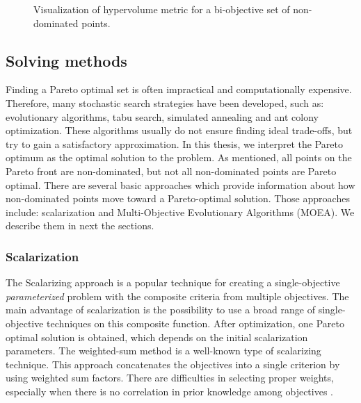 \begin{figure}
                \caption[Visualization of hypervolume metric for a bi-objective set of non-dominated points]{Visualization of hypervolume metric for a bi-objective set of non-dominated points.}
                \label{fig:hypervolume}    
            \end{figure}
 
        \subsection{Solving methods}
            Finding a Pareto optimal set is often impractical and computationally expensive. Therefore, many stochastic search strategies have been developed, such as: evolutionary algorithms, tabu search, simulated annealing and ant colony optimization. These algorithms usually do not ensure finding ideal trade-offs, but try to gain a satisfactory approximation.
            In this thesis, we interpret the Pareto optimum as the optimal solution to the problem. As mentioned, all points on the Pareto front are non-dominated, but not all non-dominated points are Pareto optimal. There are several basic approaches which provide information about how non-dominated points move toward a Pareto-optimal solution.
            Those approaches include: scalarization and Multi-Objective Evolutionary Algorithms (MOEA). We describe them in next the sections.

            \subsubsection{Scalarization}
                The Scalarizing approach is a popular technique for creating a single-objective \textit{parameterized} problem with the composite criteria from multiple objectives. The main advantage of scalarization is the possibility to use a broad range of single-objective techniques on this composite function. After optimization, one Pareto optimal solution is obtained, which depends on the initial scalarization parameters. The weighted-sum method is a well-known type of scalarizing technique. This approach concatenates the objectives into a single criterion by using weighted sum factors. There are difficulties in selecting proper weights, especially when there is no correlation in prior knowledge among objectives \cite{ChughScal2019, DerbelBLV14}. 

